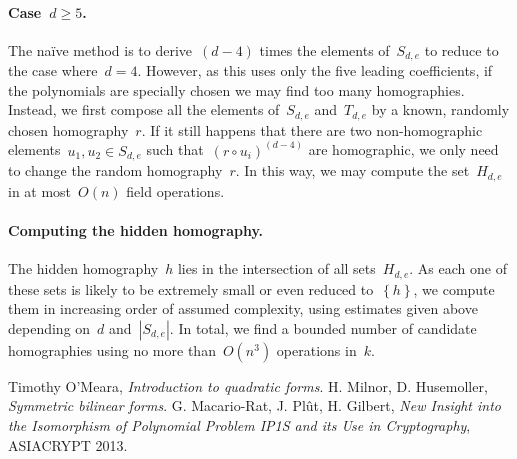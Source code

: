 \documentclass{article}%
\def\acco#1{\left\{#1\right\}}
\def\abs#1{\left|#1\right|}
\def\card#1{\abs{#1}}
\begin{document}
\paragraph{Case~$d ≥ 5$.} The naïve method is to derive~$(d-4)$ times the
elements of~$S_{d,e}$ to reduce to the case where~$d = 4$. However, as
this uses only the five leading coefficients, if the polynomials are
specially chosen we may find too many homographies. Instead, we first
compose all the elements of~$S_{d,e}$ and~$T_{d,e}$ by a known, randomly
chosen homography~$r$. If it still happens that there are two
non-homographic elements~$u_1, u_2 ∈ S_{d,e}$ such that~$(r ∘
u_i)^{(d-4)}$ are homographic, we only need to change the random
homography~$r$. In this way, we may compute the set~$H_{d,e}$ in at
most~$O(n)$ field operations.

\paragraph{Computing the hidden homography.}

The hidden homography~$h$ lies in the intersection of all sets~$H_{d,e}$.
As each one of these sets is likely to be extremely small or even reduced
to~$\acco{h}$, we compute them in increasing order of assumed complexity,
using estimates given above depending on~$d$ and~$\card{S_{d,e}}$. In
total, we find a bounded number of candidate homographies using no more
than~$O(n^3)$ operations in~$k$.


\begin{thebibliography}{99}%
 Timothy O'Meara, \emph{Introduction to quadratic forms}.
 H. Milnor, D. Husemoller, \emph{Symmetric
bilinear forms}.  G. Macario-Rat, J. Plût, H. Gilbert,
\emph{New Insight into the Isomorphism of Polynomial Problem IP1S and its
Use in Cryptography}, ASIACRYPT 2013.
\end{thebibliography}%
\end{document}
